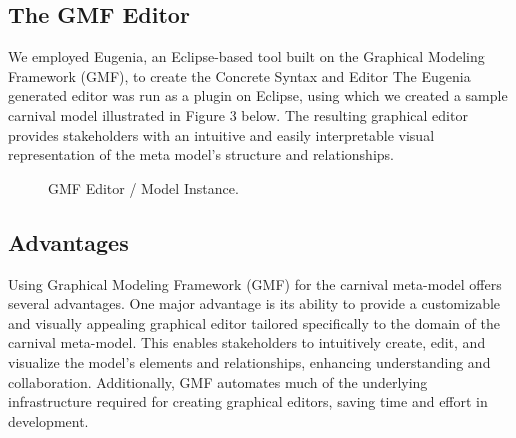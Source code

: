 \documentclass[a4paper,11pt]{report}
\begin{document}
\subsection{The GMF Editor}
We employed Eugenia, an Eclipse-based tool built on the Graphical Modeling Framework (GMF), to create the Concrete Syntax and Editor The Eugenia generated editor was run as a plugin on Eclipse, using which we created a sample carnival model illustrated in Figure 3 below. The resulting graphical editor provides stakeholders with an intuitive and easily interpretable visual representation of the meta model's structure and relationships.

\begin{figure}[h]
\begin{center}
\caption{{\footnotesize GMF Editor / Model Instance.}}
\label{Fig3}
\end{center}
\end{figure}

\subsection{Advantages}

Using Graphical Modeling Framework (GMF) for the carnival meta-model offers several advantages. One major advantage is its ability to provide a customizable and visually appealing graphical editor tailored specifically to the domain of the carnival meta-model. This enables stakeholders to intuitively create, edit, and visualize the model's elements and relationships, enhancing understanding and collaboration. Additionally, GMF automates much of the underlying infrastructure required for creating graphical editors, saving time and effort in development.
\end{document}
